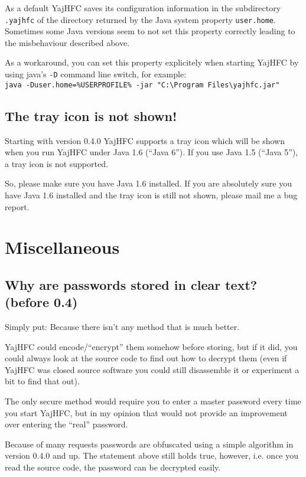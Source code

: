 \documentclass[a4paper,10pt]{scrartcl}
\begin{document}
As a default YajHFC saves its configuration information in the subdirectory \texttt{.yajhfc} of the directory returned by
the Java system property \texttt{user.home}.
Sometimes some Java versions seem to not set this property correctly leading to the misbehaviour described above.

As a workaround, you can set this property explicitely when starting YajHFC by using java's \texttt{-D} command line switch, for example: \\
\texttt{java -Duser.home=\%USERPROFILE\% -jar "C:\textbackslash Program Files\textbackslash yajhfc.jar"}

\subsection{The tray icon is not shown!}

Starting with version 0.4.0 YajHFC supports a tray icon which will be shown when you run YajHFC under Java 1.6 (``Java 6'').
If you use Java 1.5 (``Java 5''), a tray icon is not supported.

So, please make sure you have Java 1.6 installed. If you are absolutely sure you have Java 1.6 installed and the tray icon is still not shown, please mail me a bug report.


\section{Miscellaneous}

\subsection{Why are passwords stored in clear text? (before 0.4)}

Simply put: Because there isn't any method that is much better.

YajHFC could encode/``encrypt'' them somehow before storing, but if it did, 
you could always look at the source code to find out how to decrypt them
(even if YajHFC was closed source software you could still disassemble it
or experiment a bit to find that out).

The only secure method would require you to enter a master password every time
you start YajHFC, but in my opinion that would not provide an improvement over
entering the ``real'' password.

Because of many requests passwords are obfuscated using a simple algorithm in version 0.4.0 and up.
The statement above still holds true, however, i.e. once you read the source code, the password can be decrypted easily.
\end{document}
